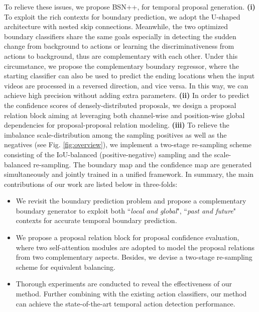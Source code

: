 \documentclass[letterpaper]{article} \usepackage{aaai21}  \usepackage{times}  \usepackage{helvet} \usepackage{courier}  \usepackage[hyphens]{url}  \usepackage{graphicx} \urlstyle{rm} \def\UrlFont{\rm}  \usepackage{natbib}  \usepackage{amsmath,amssymb} \usepackage{caption} \frenchspacing  \usepackage{color}
\begin{document}
To relieve these issues, we propose BSN++, for temporal proposal generation. \textbf{(i)} To exploit the rich contexts for boundary prediction, we adopt the U-shaped architecture with nested skip connections. Meanwhile, the two optimized boundary classifiers share the same goals especially in detecting the sudden change from background to actions or learning the discriminativeness from actions to background, thus are complementary with each other. Under this circumstance, we propose the complementary boundary regressor, where the starting classifier can also be used to predict the ending locations when the input videos are processed in a reversed direction, and vice versa. In this way, we can achieve high precision without adding extra parameters. \textbf{(ii)} In order to predict the confidence scores of densely-distributed proposals, we design a proposal relation block aiming at leveraging both channel-wise and position-wise global dependencies for proposal-proposal relation modeling. \textbf{(iii)} To relieve the imbalance scale-distribution among the sampling positives as well as the negatives (see Fig. \ref{fig:overview}), we implement a two-stage re-sampling scheme consisting of the IoU-balanced (positive-negative) sampling and the scale-balanced re-sampling. The boundary map and the confidence map are generated simultaneously and jointly trained in a unified framework. In summary, the main contributions of our work are listed below in three-folds:

\begin{itemize}
	\item We revisit the boundary prediction problem and propose a complementary boundary generator to exploit both ``\textit{local and global}", ``\textit{past and future}" contexts for accurate temporal boundary prediction.
	
	\item We propose a proposal relation block for proposal confidence evaluation, where two self-attention modules are adopted to model the proposal relations from two complementary aspects. Besides, we devise a two-stage re-sampling scheme for equivalent balancing. 
	
	\item Thorough experiments are conducted to reveal the effectiveness of our method. Further combining with the existing action classifiers, our method can achieve the state-of-the-art temporal action detection performance.
	
\end{itemize}
\end{document}
